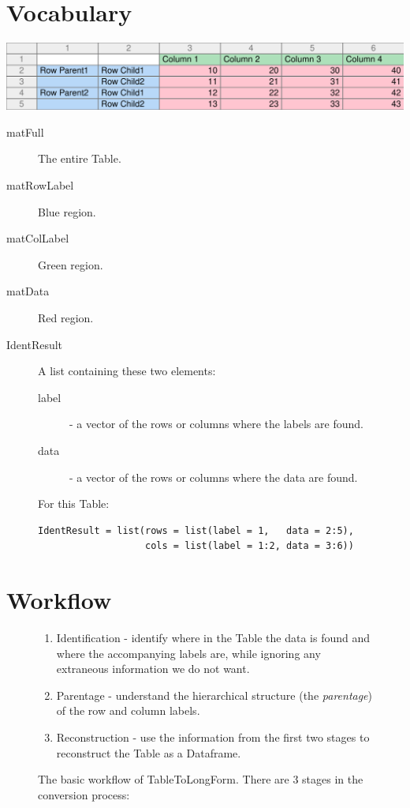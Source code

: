 \documentclass[a4paper]{article}
\begin{document}
\section{Vocabulary}
\includegraphics[width=\textwidth]{TableToLongForm_WorkingWithModules_ExampleTable.pdf}
\begin{description}
\item[matFull] The entire Table.
\item[matRowLabel] Blue region.
\item[matColLabel] Green region.
\item[matData] Red region.
\item[IdentResult] A list containing these two elements:
  \begin{description}
  \item[label] - a vector of the rows or columns where the labels are
    found.
  \item[data] - a vector of the rows or columns where the data are
    found.
  \end{description}
  For this Table:
\begin{verbatim}
IdentResult = list(rows = list(label = 1,   data = 2:5),
                   cols = list(label = 1:2, data = 3:6))
\end{verbatim}
\end{description}

\section{Workflow}
\begin{figure}[!h]
  \centering
{}  
\caption{The basic workflow of TableToLongForm. There are 3 stages in
  the conversion process:}
\begin{enumerate}
\item Identification - identify where in the Table the data is found
  and where the accompanying labels are, while ignoring any extraneous
  information we do not want.
\item Parentage - understand the hierarchical structure (the
  \emph{parentage}) of the row and column labels.
\item Reconstruction - use the information from the first two stages
  to reconstruct the Table as a Dataframe.
\end{enumerate}
\end{figure}
\end{document}
